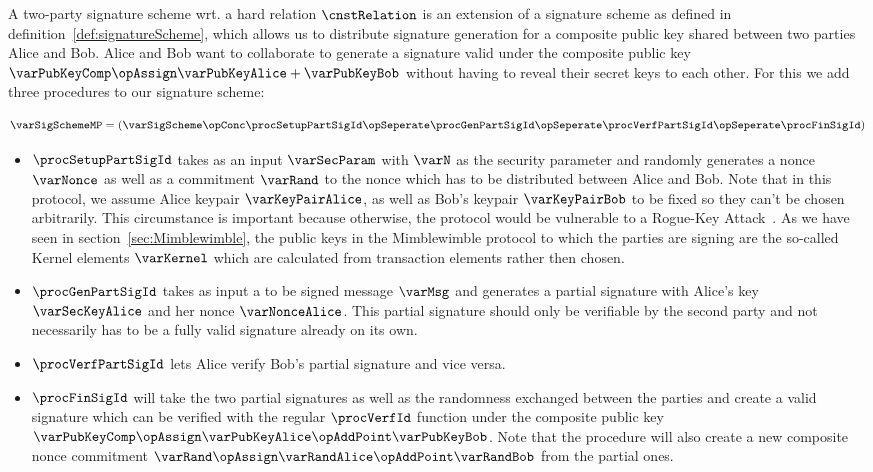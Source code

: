 \begin{definition}
    \label{def:twoPartySig}
    A two-party signature scheme wrt. a hard relation $\cnstRelation$ is an extension of a signature scheme as defined in definition~\ref{def:signatureScheme}, which allows us to distribute signature generation for a composite public key shared between two parties Alice and Bob.
    Alice and Bob want to collaborate to generate a signature valid under the composite public key $\varPubKeyComp \opAssign \varPubKeyAlice + \varPubKeyBob$ without having to reveal their secret keys to each other. For this we add three procedures to our signature scheme:
    	
    \[ \varSigSchemeMP = (\varSigScheme \opConc \procSetupPartSigId \opSeperate \procGenPartSigId \opSeperate \procVerfPartSigId \opSeperate \procFinSigId) \]
    \begin{itemize}
        \item $\procSetupPartSigId$ takes as an input $\varSecParam$ with $\varN$ as the security parameter and randomly generates a nonce $\varNonce$ as well as a commitment $\varRand$ to the nonce which has to be distributed between Alice and Bob.
               Note that in this protocol, we assume Alice keypair $\varKeyPairAlice$, as well as Bob's keypair $\varKeyPairBob$ to be fixed so they can't be chosen arbitrarily. This circumstance is important because otherwise, the protocol would be vulnerable to a
               Rogue-Key Attack~\cite{horster1995meta}. As we have seen in section~\ref{sec:Mimblewimble}, the public keys in the Mimblewimble protocol to which the parties are signing are the so-called Kernel elements $\varKernel$ which are calculated from transaction elements
               rather then chosen.
        \item $\procGenPartSigId$ takes as input a to be signed message $\varMsg$ and generates a partial signature with Alice's key $\varSecKeyAlice$ and her nonce $\varNonceAlice$. This partial signature should only be verifiable by the second party and not necessarily
               has to be a fully valid signature already on its own.
        \item $\procVerfPartSigId$ lets Alice verify Bob's partial signature and vice versa.
        \item $\procFinSigId$ will take the two partial signatures as well as the randomness exchanged between the parties and create a valid signature which can be verified with the regular $\procVerfId$ function under the composite public key
        $\varPubKeyComp \opAssign \varPubKeyAlice \opAddPoint \varPubKeyBob$. Note that the procedure will also create a new composite nonce commitment $\varRand \opAssign \varRandAlice \opAddPoint \varRandBob$ from the partial ones.
    \end{itemize}
\end{definition}

